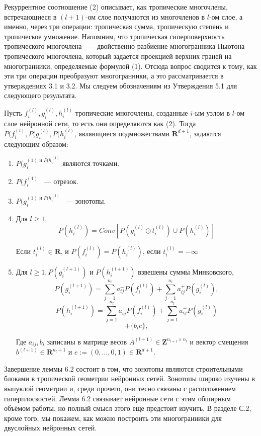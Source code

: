 \documentclass[russian]{lecture-notes}
\begin{document}
	Рекуррентное соотношение (2) описывает, как тропические многочлены, встречающиеся в $(l + 1)$-ом слое получаются из многочленов в $l$-ом слое, а именно, через три операции: тропическая сумма, тропическую степень и тропическое умножение. Напомним, что тропическая гиперповерхность тропического многочлена ~--- двойственно разбиение многогранника Ньютона тропического многочлена, который задается проекцией верхних граней на многогранники, определяемые формулой (1). Отсюда вопрос сводится к тому, как эти три операции преобразуют многогранники, а это рассматривается в утверждениях 3.1 и 3.2. Мы следуем обозначениям из Утверждения 5.1 для следующего результата.
	
	\begin{Lemma}
		Пусть $f_i^{(l)},g_i^{(l)},h_i^{(l)}$ тропические многочлены, созданные $i$-ым узлом в $l$-ом слое нейронной сети, то есть они определяются как (2). Тогда $P(f_i^{(l)}, P(g_i^{(l)},P(h_i^{(l)}$, являющиеся подмножествами $\mathbf{R}^{d+1}$, задаются следующим образом:
		\begin{enumerate}
			\item $P(g_i^{(1) \text{ и } P(h_i^{(1)}}$ являются точками.
			\item $P(f_i^{(1)}$ ~--- отрезок.
			\item $P(g_i^{(1) \text{ и } P(h_i^{(1)}}$ ~--- зонотопы.
			\item Для $l \geq 1$,
			\[
				P(h_i^{(l)}) = Conv[P(g_i^{(l)}\odot t_i^{(l)}) \cup P(h_i^{(l)})]
			\]
			
			Если $t_i^{(l)} \in \mathbf{R}$, и $P(f_i^{(l)}) = P(h_i^{(l)})$, если $t_i^{(l)} = -\infty$
			\item Для $l \geq  1, P(g_i^{(l+1)})\text{ и } P(h_i^{(l+1)}) $ взвешены суммы Минковского, 
			\[
				P(g_i^{(l+1)}) = \sum\limits_{j=1}^{n_l} a_{ij}^-P(f_i^{(l)}) + \sum\limits_{j=1}^{n_l} a_{ij}^+P(g_i^{(l)}),
			\]
			\[
			P(h_i^{(l+1)}) = \sum\limits_{j=1}^{n_l} a_{ij}^+P(f_i^{(l)}) + \sum\limits_{j=1}^{n_l} a_{ij}^-P(g_i^{(l)})
			\]
			\[
				+\{b_ie\},
			\]
			
			Где $a_{ij}, b_i$ записаны в матрице весов $A^(l+1) \in \mathbf{Z}^{n_{l+1}\times n_l}$ и вектор смещения $b^(l+1) \in \mathbf{R}^{n_l+1} \text{ и } e:= (0, \dots,0,1)\in \mathbf{R}^{d+1}$.			
		\end{enumerate}
		\end{Lemma}
		Завершение леммы 6.2 состоит в том, что зонотопы являются строительными блоками в тропической геометрии нейронных сетей. Зонотопы широко изучены в выпуклой геометрии и, среди прочего, они тесно связаны с расположением гиперплоскостей. Лемма 6.2 связывает нейронные сети с этим обширным объёмом работы, но полный смысл этого еще предстоит изучить. В разделе С.2, кроме того, мы покажем, как можно построить эти многогранники для двуслойных нейронных сетей.
		
\end{document}
